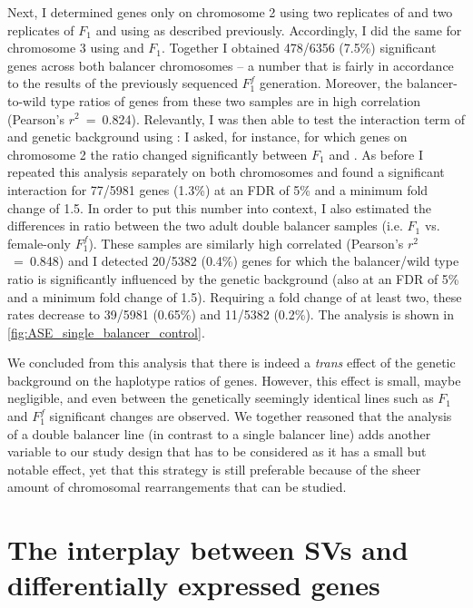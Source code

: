 Next, I determined \ase genes only on chromosome 2 using two replicates of \Fcyo
and two replicates of $F_1$ and using \deseq as described previously.
Accordingly, I did the same for chromosome 3 using \Ftm and $F_1$.
Together I obtained 478/6356 (7.5\%) significant \ase genes across both balancer
chromosomes – a number that is fairly in accordance to the results of the
previously sequenced $F_1^f$ generation. Moreover, the balancer-to-wild type
ratios of genes from these two samples are in high correlation (Pearson’s
$r^2$~=~0.824). Relevantly, I was then able to test the interaction term of \ase
and genetic background using \deseq: I asked, for instance, for which genes on
chromosome 2 the \ase ratio changed significantly between $F_1$ and \Fcyo.
As before I repeated this analysis separately on both chromosomes and found a
significant interaction for 77/5981 genes (1.3\%) at an FDR of 5\% and a
minimum fold change of 1.5. In order to put this number into context, I also
estimated the differences in \ase ratio between the two adult double balancer
samples (i.e. $F_1$ vs. female-only $F_1^f$). These samples are similarly
high correlated (Pearson’s $r^2$~=~0.848) and I detected 20/5382 (0.4\%) genes
for which the balancer/wild type ratio is significantly influenced by the
genetic background (also at an FDR of 5\% and a minimum fold change of 1.5).
Requiring a fold change of at least two, these rates decrease to 39/5981
(0.65\%) and 11/5382 (0.2\%).
The analysis is shown in \cref{fig:ASE_single_balancer_control}.

We concluded from this analysis that there is indeed a \textit{trans} effect of
the genetic background on the haplotype ratios of genes. However, this effect is
small, maybe negligible, and even between the genetically seemingly identical
lines such as $F_1$ and $F_1^f$ significant changes are observed.
We together reasoned that the analysis of a double balancer line (in contrast
to a single balancer line) adds another variable to our study design that has to
be considered as it has a small but notable effect, yet that this strategy is
still preferable because of the sheer amount of chromosomal rearrangements that
can be studied.







\section{The interplay between SVs and differentially expressed genes}
\label{sec:balancer_sv_interplay}

